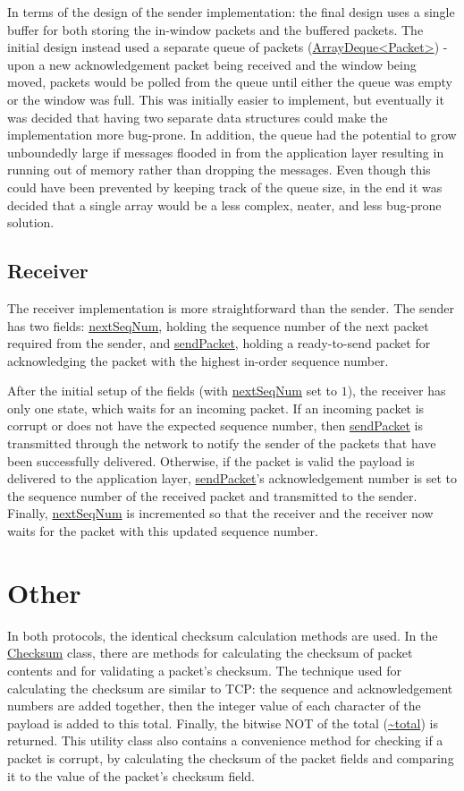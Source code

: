 \documentclass[a4paper]{article}
\newcommand{\code}{\url}
\begin{document}
In terms of the design of the sender implementation: the final design uses a single buffer for both storing the in-window packets and the buffered packets. The initial design instead used a separate queue of packets (\code{ArrayDeque<Packet>}) - upon a new acknowledgement packet being received and the window being moved, packets would be polled from the queue until either the queue was empty or the window was full. This was initially easier to implement, but eventually it was decided that having two separate data structures could make the implementation more bug-prone. In addition, the queue had the potential to grow unboundedly large if messages flooded in from the application layer resulting in running out of memory rather than dropping the messages. Even though this could have been prevented by keeping track of the queue size, in the end it was decided that a single array would be a less complex, neater, and less bug-prone solution.


\subsection{Receiver}

The receiver implementation is more straightforward than the sender. The sender has two fields: \code{nextSeqNum}, holding the sequence number of the next packet required from the sender, and \code{sendPacket}, holding a ready-to-send packet for acknowledging the packet with the highest in-order sequence number.

After the initial setup of the fields (with \code{nextSeqNum} set to $1$), the receiver has only one state, which waits for an incoming packet. If an incoming packet is corrupt or does not have the expected sequence number, then \code{sendPacket} is transmitted through the network to notify the sender of the packets that have been successfully delivered. Otherwise, if the packet is valid the payload is delivered to the application layer, \code{sendPacket}'s acknowledgement number is set to the sequence number of the received packet and transmitted to the sender. Finally, \code{nextSeqNum} is incremented so that the receiver and the receiver now waits for the packet with this updated sequence number.

\section{Other}

In both protocols, the identical checksum calculation methods are used. In the \code{Checksum} class, there are methods for calculating the checksum of packet contents and for validating a packet's checksum. The technique used for calculating the checksum are similar to TCP: the sequence and acknowledgement numbers are added together, then the integer value of each character of the payload is added to this total. Finally, the bitwise NOT of the total (\code{~total}) is returned. This utility class also contains a convenience method for checking if a packet is corrupt, by calculating the checksum of the packet fields and comparing it to the value of the packet's checksum field.
\end{document}
